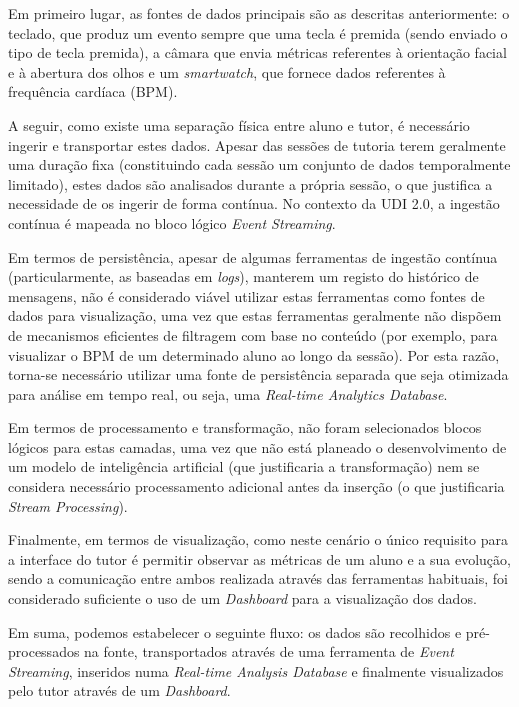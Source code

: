 Em primeiro lugar, as fontes de dados principais são as descritas anteriormente: o teclado, que produz um evento sempre que uma tecla é premida (sendo enviado o tipo de tecla premida), a câmara que envia métricas referentes à orientação facial e à abertura dos olhos e um \textit{smartwatch}, que fornece dados referentes à frequência cardíaca (\ac{BPM}).

A seguir, como existe uma separação física entre aluno e tutor, é necessário ingerir e transportar estes dados. Apesar das sessões de tutoria terem geralmente uma duração fixa (constituindo cada sessão um conjunto de dados temporalmente limitado), estes dados são analisados durante a própria sessão, o que justifica a necessidade de os ingerir de forma contínua.
No contexto da \ac{UDI 2.0}, a ingestão contínua é mapeada no bloco lógico \textit{Event Streaming}.

Em termos de persistência, apesar de algumas ferramentas de ingestão contínua (particularmente, as baseadas em \textit{logs}), manterem um registo do histórico de mensagens, não é considerado viável utilizar estas ferramentas como fontes de dados para visualização, uma vez que estas ferramentas geralmente não dispõem de mecanismos eficientes de filtragem com base no conteúdo (por exemplo, para visualizar o \ac{BPM} de um determinado aluno ao longo da sessão).
Por esta razão, torna-se necessário utilizar uma fonte de persistência separada que seja otimizada para análise em tempo real, ou seja, uma \textit{Real-time Analytics Database}.

Em termos de processamento e transformação, não foram selecionados blocos lógicos para estas camadas, uma vez que não está planeado o desenvolvimento de um modelo de inteligência artificial (que justificaria a transformação) nem se considera necessário processamento adicional antes da inserção (o que justificaria \textit{Stream Processing}).

Finalmente, em termos de visualização, como neste cenário o único requisito para a interface do tutor é permitir observar as métricas de um aluno e a sua evolução, sendo a comunicação entre ambos realizada através das ferramentas habituais, foi considerado suficiente o uso de um \textit{Dashboard} para a visualização dos dados.

Em suma, podemos estabelecer o seguinte fluxo: os dados são recolhidos e pré-processados na fonte, transportados através de uma ferramenta de \textit{Event Streaming}, inseridos numa \textit{Real-time Analysis Database} e finalmente visualizados pelo tutor através de um \textit{Dashboard}.

